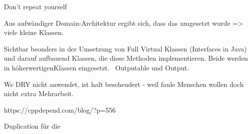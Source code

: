 
Don't repeat yourself

Aus aufwändiger Domain-Architektur ergibt sich, dass das umgesetzt wurde => viele kleine Klassen.



Sichtbar beonders in der Umsetzung von Full Virtual Klassen (Interfaces in Java) und darauf aufbauend Klassen, die diese Methoden implementieren.
Beide werden in \glq höherwertigen\grqq Klassen eingesetzt. \zB\ Outputable und Output.



We DRY nicht anwendet, ist halt bescheudert - weil faule Menschen wollen doch nicht extra Mehrarbeit.








https://cppdepend.com/blog/?p=556



Duplication
für die 